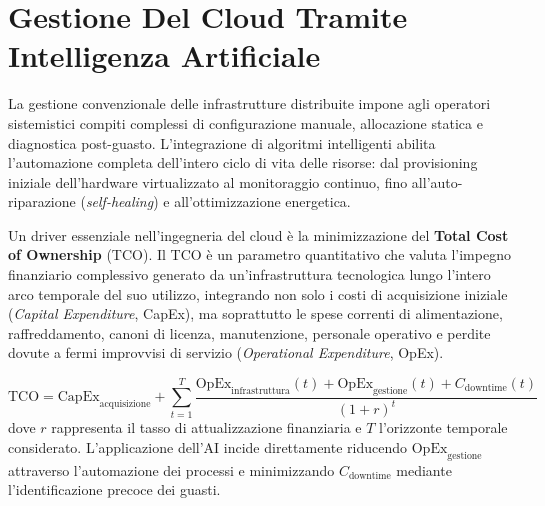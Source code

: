 \documentclass[11pt, a4paper]{article}
\begin{document}
\newpage


\section{Gestione Del Cloud Tramite Intelligenza Artificiale}

La gestione convenzionale delle infrastrutture distribuite impone agli operatori sistemistici compiti complessi di configurazione manuale, allocazione statica e diagnostica post-guasto. L'integrazione di algoritmi intelligenti abilita l'automazione completa dell'intero ciclo di vita delle risorse: dal provisioning iniziale dell'hardware virtualizzato al monitoraggio continuo, fino all'auto-riparazione (\emph{self-healing}) e all'ottimizzazione energetica.


Un driver essenziale nell'ingegneria del cloud è la minimizzazione del \textbf{Total Cost of Ownership} (TCO). Il TCO è un parametro quantitativo che valuta l'impegno finanziario complessivo generato da un'infrastruttura tecnologica lungo l'intero arco temporale del suo utilizzo, integrando non solo i costi di acquisizione iniziale (\emph{Capital Expenditure}, CapEx), ma soprattutto le spese correnti di alimentazione, raffreddamento, canoni di licenza, manutenzione, personale operativo e perdite dovute a fermi improvvisi di servizio (\emph{Operational Expenditure}, OpEx).

\begin{equation}
    \text{TCO} = \text{CapEx}_{\text{acquisizione}} + \sum_{t=1}^{T} \frac{\text{OpEx}_{\text{infrastruttura}}(t) + \text{OpEx}_{\text{gestione}}(t) + C_{\text{downtime}}(t)}{(1 + r)^t}
\end{equation}
dove $r$ rappresenta il tasso di attualizzazione finanziaria e $T$ l'orizzonte temporale considerato. L'applicazione dell'AI incide direttamente riducendo $\text{OpEx}_{\text{gestione}}$ attraverso l'automazione dei processi e minimizzando $C_{\text{downtime}}$ mediante l'identificazione precoce dei guasti.

\end{document}

